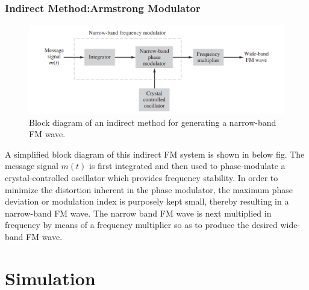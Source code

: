 \documentclass[12pt,a4paper]{article}%
\begin{document}
\begin{flushleft}
	\subsubsection{Indirect Method:Armstrong Modulator}
	\begin{center}
		\begin{figure}[!ht]
			\centering
			\includegraphics[scale=0.4]{./images/BD2.png}
			\caption{Block diagram of an indirect method for generating a narrow-band FM wave.}
			\label{BD2}
		\end{figure}
	\end{center}
	
	
	A simplified block diagram of this indirect FM system is shown in below fig. The message signal $m(t)$ is first integrated and then used to phase-modulate a crystal-controlled oscillator which provides frequency stability. In order to minimize the distortion inherent in the phase modulator, the maximum phase deviation or modulation index is purposely kept small, thereby resulting in a narrow-band FM wave. The narrow band FM wave is next multiplied in frequency by means of a frequency multiplier so as to produce the desired wide-band FM wave.
	\end{flushleft}
	\pagebreak
	\section{Simulation}
\end{document}
